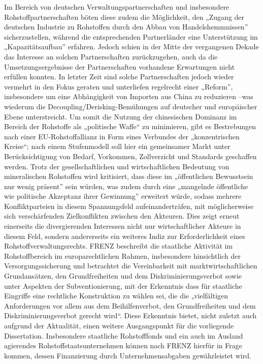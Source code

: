 \documentclass[12pt,a4paper,oneside]{book} %
\begin{document}
Im Bereich von deutschen Verwaltungspartnerschaften und insbesondere Rohstoffpartnerschaften böten diese zudem die Möglichkeit, den „Zugang der deutschen Industrie zu Rohstoffen durch den Abbau von Handelshemmnissen” sicherzustellen, während die entsprechenden Partnerländer eine Unterstützung im „Kapazitätsaufbau” erfahren.\autocite{ruttinger_deutschen_2016} Jedoch schien in der Mitte der vergangenen Dekade das Interesse an solchen Partnerschaften zurückzugehen, auch da die Umsetzungsergebnisse der Partnerschaften vorhandene Erwartungen nicht erfüllen konnten.\autocite{ruttinger_deutschen_2016} In letzter Zeit sind solche Partnerschaften jedoch wieder vermehrt in den Fokus geraten und unterliefen regelrecht einer „Reform”, insbesondere um eine Abhängigkeit von Importen aus China zu reduzieren\autocite{muller_reform_2023} --was wiederum die Decoupling/Derisking-Bemühungen auf deutscher und europäischer Ebene unterstreicht. Um somit die Nutzung der chinesischen Dominanz im Bereich der Rohstoffe als „politische Waffe“ zu minimieren, gibt es Bestrebungen nach einer EU-Rohstoffallianz in Form eines Verbundes der „konzentrischen Kreise“; nach einem Stufenmodell soll hier ein gemeinsamer Markt unter Berücksichtigung von Bedarf, Vorkommen, Zollverzicht und Standards geschaffen werden.\autocite{sauga_klub_2023} Trotz der gesellschaftlichen und wirtschaftlichen Bedeutung von mineralischen Rohstoffen wird kritisiert, dass diese im „öffentlichen Bewusstsein nur wenig präsent” sein würden, was zudem durch eine „mangelnde öffentliche wie politische Akzeptanz ihrer Gewinnung” erweitert würde, sodass mehrere Konfliktparteien in diesem Spannungsfeld aufeinanderträfen, mit möglicherweise sich verschärfenden Zielkonflikten zwischen den Akteuren.\autocite{kuhne_gewinnung_2020} Dies zeigt erneut einerseits die divergierenden Interessen nicht nur wirtschaftlicher Akteure in diesem Feld, sondern andererseits ein weiteres Indiz zur Erforderlichkeit eines Rohstoffverwaltungsrechts.
FRENZ beschreibt die staatliche Aktivität im Rohstoffbereich im europarechtlichen Rahmen, insbesondere hinsichtlich der Versorgungssicherung und betrachtet die Vereinbarkeit mit marktwirtschaftlichen Grundansätzen, den Grundfreiheiten und dem Diskriminierungsverbot sowie unter Aspekten der Subventionierung, mit der Erkenntnis dass für staatliche Eingriffe eine rechtliche Konstruktion zu wählen sei, die die „vielfältigen Anforderungen vor allem aus dem Beihilfenverbot, den Grundfreiheiten und dem Diskriminierungsverbot gerecht wird“.\autocite{frenz_staatliche_2023} Diese Erkenntnis bietet, nicht zuletzt auch aufgrund der Aktualität, einen weitere Ausgangspunkt für die vorliegende Dissertation. Insbesondere staatliche Rohstofffonds und ein auch im Ausland agierendes Rohstoffstaatsunternehmen können nach FRENZ hierfür in Frage kommen, dessen Finanzierung durch Unternehmensabgaben gewährleistet wird.\autocite{frenz_unternehmensabgabe_2023}
\end{document}
